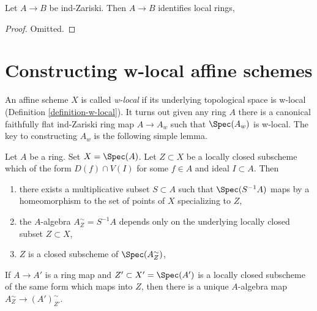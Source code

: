 \begin{lemma}
\label{lemma-ind-zariski-implies}
Let $A \to B$ be ind-Zariski. Then $A \to B$ identifies local rings,
\end{lemma}

\begin{proof}
Omitted.
\end{proof}







\section{Constructing w-local affine schemes}
\label{section-construction}

\noindent
An affine scheme $X$ is called {\it w-local} if its underlying
topological space is w-local (Definition \ref{definition-w-local}).
It turns out given any ring $A$ there is a canonical faithfully
flat ind-Zariski ring map $A \to A_w$ such that $\Spec(A_w)$ is
w-local. The key to constructing $A_w$ is the following simple lemma.

\begin{lemma}
\label{lemma-localization}
Let $A$ be a ring. Set $X = \Spec(A)$. Let $Z \subset X$ be a locally closed
subscheme which of the form $D(f) \cap V(I)$ for some $f \in A$ and
ideal $I \subset A$. Then
\begin{enumerate}
\item there exists a multiplicative subset $S \subset A$ such that
$\Spec(S^{-1}A)$ maps by a homeomorphism to the set of points of $X$
specializing to $Z$,
\item the $A$-algebra $A_Z^\sim = S^{-1}A$ depends only on
the underlying locally closed subset $Z \subset X$,
\item $Z$ is a closed subscheme of $\Spec(A_Z^\sim)$,
\end{enumerate}
If $A \to A'$ is a ring map and $Z' \subset X' = \Spec(A')$ is a
locally closed subscheme of the same form which maps into $Z$,
then there is a unique $A$-algebra map
$A_Z^\sim \to (A')_{Z'}^\sim$.
\end{lemma}

